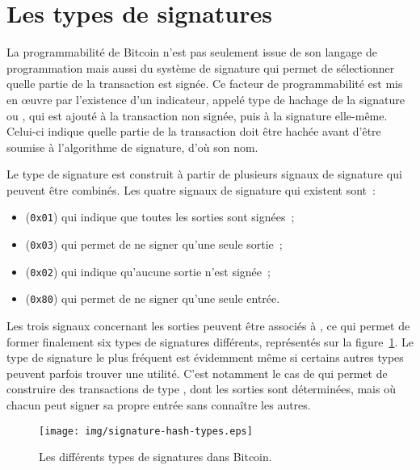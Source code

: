 \section*{Les types de signatures}


La programmabilité de Bitcoin n'est pas seulement issue de son langage de programmation mais aussi du système de signature qui permet de sélectionner quelle partie de la transaction est signée. Ce facteur de programmabilité est mis en œuvre par l'existence d'un indicateur, appelé type de hachage de la signature ou , qui est ajouté à la transaction non signée, puis à la signature elle-même. Celui-ci indique quelle partie de la transaction doit être hachée avant d'être soumise à l'algorithme de signature, d'où son nom.

Le type de signature est construit à partir de plusieurs signaux de signature qui peuvent être combinés. Les quatre signaux de signature qui existent sont~:

\begin{itemize}
\item {} (\texttt{0x01}) qui indique que toutes les sorties sont signées~;
\item {} (\texttt{0x03}) qui permet de ne signer qu'une seule sortie~;
\item {} (\texttt{0x02}) qui indique qu'aucune sortie n'est signée~;
\item {} (\texttt{0x80}) qui permet de ne signer qu'une seule entrée.
\end{itemize}

Les trois signaux concernant les sorties peuvent être associés à , ce qui permet de former finalement six types de signatures différents, représentés sur la figure~\ref{fig:signature-hash-types}. Le type de signature le plus fréquent est évidemment  même si certains autres types peuvent parfois trouver une utilité. C'est notamment le cas de  qui permet de construire des transactions de type , dont les sorties sont déterminées, mais où chacun peut signer sa propre entrée sans connaître les autres.

\begin{figure}[ht]
  \centering
  \texttt{[image: img/signature-hash-types.eps]}
  \caption{Les différents types de signatures dans Bitcoin.}
  \label{fig:signature-hash-types}
\end{figure}

